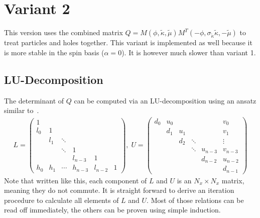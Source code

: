 \documentclass[a4paper, fleqn, twoside, notitlepage]{scrartcl}
\begin{document}
\clearpage
\section{Variant 2}

This version uses the combined matrix $Q = M(\phi, \tilde{\kappa}, \tilde{\mu}) M^T(-\phi, \sigma_{\tilde{\kappa}}\tilde{\kappa}, -\tilde{\mu})$ to treat particles and holes together.
This variant is implemented as well because it is more stable in the spin basis ($\alpha=0$).
It is however much slower than variant 1.

\subsection{LU-Decomposition}\label{sec:lu_decomposition_v2}

The determinant of $Q$ can be computed via an LU-decomposition using an ansatz similar to~\cite{zivkovic:2013}.
\begin{align}
  L =
  \begin{pmatrix}
    1   &     &        &        &        &\\
    l_0 & 1   &        &        &        &\\
        & l_1 & \ddots &        &        &\\
        &     & \ddots & 1      &        &\\
        &     &        & l_{n-3} & 1      & \\
    h_0 & h_1 & \cdots  & h_{n-3} & l_{n-2} & 1
  \end{pmatrix},
  \; U =
  \begin{pmatrix}
    d_0 & u_0 &        &        &        & v_0    \\
        & d_1 & u_1    &        &        & v_1    \\
        &     & d_2    & \ddots &        & \vdots \\
        &     &        & \ddots & u_{n-3} & v_{n-3} \\
        &     &        &        & d_{n-2} & u_{n-2} \\
        &     &        &        &        & d_{n-1}
  \end{pmatrix}
\end{align}
Note that written like this, each component of $L$ and $U$ is an $N_x \times N_x$ matrix, meaning they do not commute.
It is straight forward to derive an iteration procedure to calculate all elements of $L$ and $U$. Most of those relations can be read off immediately, the others can be proven using
simple induction.\\
\end{document}
